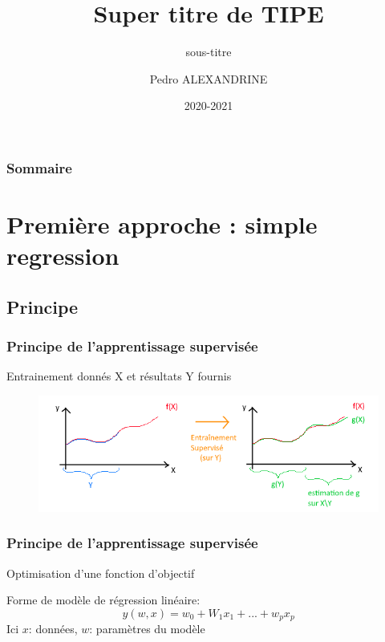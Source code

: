 \documentclass{beamer}
\title{Super titre de TIPE}
\subtitle{sous-titre}
\institute{numero d'inscription : 41758}
\author{Pedro ALEXANDRINE}
\date{2020-2021}
\begin{document}
\begin{frame}
	\maketitle
\end{frame}

\begin{frame}
	\frametitle{Sommaire}
	\tableofcontents
\end{frame}

\section{Première approche : simple regression}
\subsection{Principe}
\begin{frame}
	\frametitle{Principe de l'apprentissage supervisée}
	Entrainement donnés X et résultats Y fournis
	\begin{figure}[b]
		\centering
		\includegraphics[scale=0.65]{super_schema}
	\end{figure}
\end{frame}

\begin{frame}
	\frametitle{Principe de l'apprentissage supervisée}
	Optimisation d'une fonction d'objectif
	
	Forme de modèle de régression linéaire:
	\[y(w,x)=w_0+W_1x_1+...+w_px_p\]
	Ici $x$: données, $w$: paramètres du modèle
\end{frame}
\end{document}
